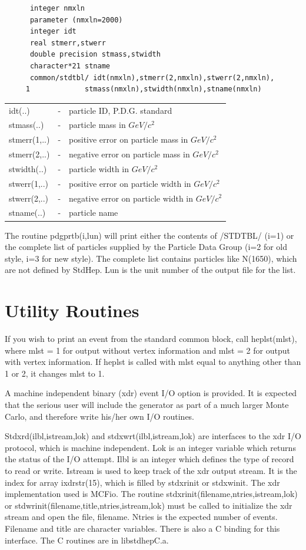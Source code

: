 \begin{verbatim}
      integer nmxln
      parameter (nmxln=2000)
      integer idt
      real stmerr,stwerr
      double precision stmass,stwidth
      character*21 stname
      common/stdtbl/ idt(nmxln),stmerr(2,nmxln),stwerr(2,nmxln),
     1             stmass(nmxln),stwidth(nmxln),stname(nmxln)
\end{verbatim}
\begin{center}
\begin{tabular}{lcl}
idt(..)     &-&particle ID, P.D.G. standard \\
stmass(..)  &-&particle mass in $GeV/c^2$ \\
stmerr(1,..)&-&positive error on particle mass in $GeV/c^2$ \\
stmerr(2,..)&-&negative error on particle mass in $GeV/c^2$ \\
stwidth(..) &-&particle width in $GeV/c^2$ \\
stwerr(1,..)&-&positive error on particle width in $GeV/c^2$ \\
stwerr(2,..)&-&negative error on particle width in $GeV/c^2$ \\
stname(..)  &-&particle name \\
\end{tabular}
\end{center}

The routine pdgprtb(i,lun) will print either the contents of /STDTBL/
(i=1) or the complete list of particles supplied by the Particle
Data Group (i=2 for old style, i=3 for new style).
The complete list contains particles like N(1650),
which are not defined by StdHep.
Lun is the unit number of the output file for the list.

\section { Utility Routines }

If you wish to print an event from the standard common block, call
heplst(mlst), where mlst = 1 for output without vertex information and
mlst = 2 for output with vertex information.  If heplst is
called with mlst equal to anything other than 1 or 2, it changes mlst to 1.

A machine independent binary (xdr) event I/O option is provided.
It is expected that the serious user
will include the generator as part of a much larger Monte Carlo, and
therefore write his/her own I/O routines.

Stdxrd(ilbl,istream,lok) and stdxwrt(ilbl,istream,lok) are interfaces
to the xdr I/O protocol, which is machine independent.
Lok is an integer variable which returns the status of the I/O attempt.
Ilbl is an integer which defines the type of record to read or write.
Istream is used to keep track of the xdr output stream.  It is the index
for array ixdrstr(15), which is filled by stdxrinit or stdxwinit.
The xdr implementation used is MCFio.
The routine stdxrinit(filename,ntries,istream,lok)
or stdwrinit(filename,title,ntries,istream,lok) must be called
to initialize the xdr stream and open the file, filename.
Ntries is the expected number of events.
Filename and title are character variables.
There is also a C binding for this interface.  The C routines are
in libstdhepC.a.

